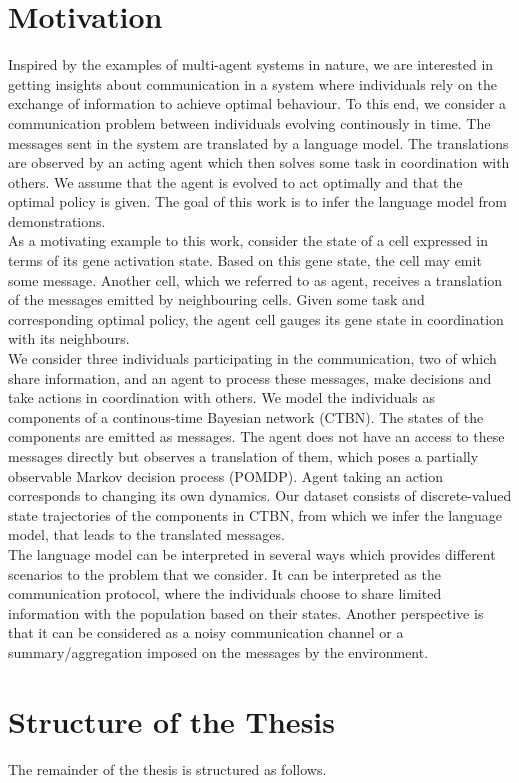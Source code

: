 \section{Motivation}
Inspired by the examples of multi-agent systems in nature, we are interested in getting insights about communication in a system where individuals rely on the exchange of information to achieve optimal behaviour. To this end, we consider a communication problem between individuals evolving continously in time. The messages sent in the system are translated by a language model. The translations are observed by an acting agent which then solves some task in coordination with others. We assume that the agent is evolved to act optimally and that the optimal policy is given. The goal of this work is to infer the language model from demonstrations.\\
As a motivating example to this work, consider the state of a cell expressed in terms of its gene activation state. Based on this gene state, the cell may emit some message. Another cell, which we referred to as agent, receives a translation of the messages emitted by neighbouring cells. Given some task and corresponding optimal policy, the agent cell gauges its gene state in coordination with its neighbours.\\
We consider three individuals participating in the communication, two of which share information, and an agent to process these messages, make decisions and take actions in coordination with others. We model the individuals as components of a continous-time Bayesian network (CTBN). The states of the components are emitted as messages. The agent does not have an access to these messages directly but observes a translation of them, which poses a partially observable Markov decision process (POMDP). Agent taking an action corresponds to changing its own dynamics. Our dataset consists of discrete-valued state trajectories of the components in CTBN, from which we infer the language model, that leads to the translated messages.\\
The language model can be interpreted in several ways which provides different scenarios to the problem that we consider. It can be interpreted as the communication protocol, where the individuals choose to share limited information with the population based on their states. Another perspective is that it can be considered as a noisy communication channel or a summary/aggregation imposed on the messages by the environment. 
\pagebreak
\section{Structure of the Thesis}
The remainder of the thesis is structured as follows.

